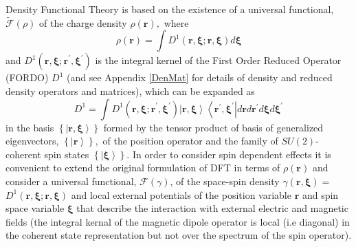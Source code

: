 \documentclass[aps,preprint]{revtex4}%
\begin{document}
\bigskip Density Functional Theory is based on the existence of a universal
functional, $\mathcal{\tilde{F}}\left(  \rho\right)  $ \cite{HK} of the charge
density $\rho\left(  \mathbf{r}\right)  ,$ where
\begin{equation}
\rho\left(  \mathbf{r}\right)  =\int D^{1}\left(  \mathbf{r,\xi;r,\xi}\right)
d\mathbf{\xi}%
\end{equation}
and $D^{1}\left(  \mathbf{r,\xi;r}^{\prime}\mathbf{,\xi}^{\prime}\right)  $ is
the integral kernel of the First Order Reduced Operator (FORDO) $D^{1}$
\cite{Coleman} (and see Appendix \ref{DenMat} for details of density and
reduced density operators and matrices), which can be expanded as
\begin{equation}
D^{1}=\int D^{1}\left(  \mathbf{r,\xi;r}^{\prime}\mathbf{,\xi}^{\prime
}\right)  \left\vert \mathbf{r,\xi}\right\rangle \left\langle \mathbf{r}%
^{\prime}\mathbf{,\xi}^{\prime}\right\vert d\mathbf{r}d\mathbf{r}^{\prime
}d\mathbf{\xi}d\mathbf{\xi}^{\prime}%
\end{equation}
in the basis $\left\{  \left\vert \mathbf{r,\xi}\right\rangle \right\}  $
formed by the tensor product of basis of generalized eigenvectors, $\left\{
\left\vert \mathbf{r}\right\rangle \right\}  ,$ of the position operator and
the family of $SU(2)$-coherent spin states $\left\{  \left\vert \mathbf{\xi
}\right\rangle \right\}  $. In order to consider spin dependent effects it is
convenient to extend the original formulation of DFT in terms of $\rho\left(
\mathbf{r}\right)  $ and consider a universal functional, $\mathcal{F}\left(
\gamma\right)  $, of the space-spin density $\gamma\left(  \mathbf{r,\xi
}\right)  =$ $D^{1}\left(  \mathbf{r,\xi;r,\xi}\right)  $
\cite{weiner-trickey} and local external potentials of the position variable
$\mathbf{r}$ and spin space variable $\mathbf{\xi}$ that describe the
interaction with external electric and magnetic fields (the integral kernal of
the magnetic dipole operator is local (i.e diagonal) in the coherent state
representation but not over the spectrum of the spin operator)$.$
\end{document}
